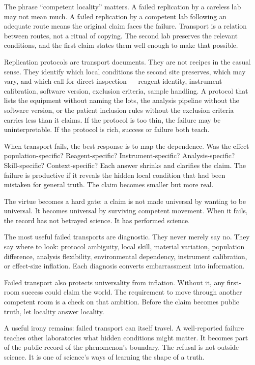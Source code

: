 The phrase ``competent locality'' matters. A failed replication by a
careless lab may not mean much. A failed replication by a competent lab
following an adequate route means the original claim faces the failure.
Transport is a relation between routes, not a ritual of copying. The
second lab preserves the relevant conditions, and the first claim states
them well enough to make that possible.

Replication protocols are transport documents. They are not recipes in
the casual sense. They identify which local conditions the second site
preserves, which may vary, and which call for direct inspection ---
reagent identity, instrument calibration, software version, exclusion
criteria, sample handling. A protocol that lists the equipment without
naming the lots, the analysis pipeline without the software version, or
the patient inclusion rules without the exclusion criteria carries less
than it claims. If the protocol is too thin, the failure may be
uninterpretable. If the protocol is rich, success or failure both teach.

When transport fails, the best response is to map the dependence. Was
the effect population-specific? Reagent-specific? Instrument-specific?
Analysis-specific? Skill-specific? Context-specific? Each answer shrinks
and clarifies the claim. The failure is productive if it reveals the
hidden local condition that had been mistaken for general truth. The
claim becomes smaller but more real.

The virtue becomes a hard gate: a claim is not made universal by wanting
to be universal. It becomes universal by surviving competent movement. When it fails, the record has
not betrayed science. It has performed science.

The most useful failed transports are diagnostic. They never merely say
no. They say where to look: protocol ambiguity, local skill, material
variation, population difference, analysis flexibility, environmental
dependency, instrument calibration, or effect-size inflation. Each
diagnosis converts embarrassment into information.

Failed transport also protects universality from inflation. Without it,
any first-room success could claim the world. The requirement to move
through another competent room is a check on that ambition. Before the
claim becomes public truth, let locality answer locality.

A useful irony remains: failed transport can itself travel. A
well-reported failure teaches other laboratories what hidden conditions
might matter. It becomes part of the public record of the phenomenon's
boundary. The refusal is not outside science. It is one of science's
ways of learning the shape of a truth.

